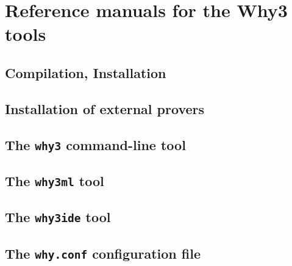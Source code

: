 \chapter{Reference manuals for the Why3 tools}

\section{Compilation, Installation}

\section{Installation of external provers}

\section{The \texttt{why3} command-line tool}

\section{The \texttt{why3ml} tool}

\section{The \texttt{why3ide} tool}

\section{The \texttt{why.conf} configuration file}



